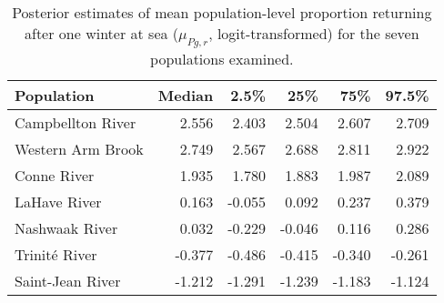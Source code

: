 \begin{table}[ht]
\centering
\caption{Posterior estimates of mean population-level
                     proportion returning after one winter at sea 
                    ($\mu_{Pg,r}$, logit-transformed) for the seven populations examined.} 
\label{tab:prmu}
\begin{tabular}{lrrrrr}
  \hline
Population & Median & 2.5\% & 25\% & 75\% & 97.5\% \\ 
  \hline
Campbellton River & 2.556 & 2.403 & 2.504 & 2.607 & 2.709 \\ 
  Western Arm Brook & 2.749 & 2.567 & 2.688 & 2.811 & 2.922 \\ 
  Conne River & 1.935 & 1.780 & 1.883 & 1.987 & 2.089 \\ 
  LaHave River & 0.163 & -0.055 & 0.092 & 0.237 & 0.379 \\ 
  Nashwaak River & 0.032 & -0.229 & -0.046 & 0.116 & 0.286 \\ 
  Trinité River & -0.377 & -0.486 & -0.415 & -0.340 & -0.261 \\ 
  Saint-Jean River & -1.212 & -1.291 & -1.239 & -1.183 & -1.124 \\ 
   \hline
\end{tabular}
\end{table}
